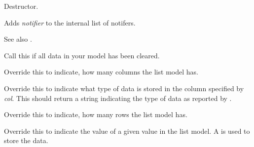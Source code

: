 \label{wxdataviewlistmodeldtor}


Destructor.

\label{wxdataviewlistmodeladdnotifier}


Adds {\it notifier} to the internal list of notifers.

See also .

\label{wxdataviewlistmodelcleared}


Call this if all data in your model has been cleared.

\label{wxdataviewlistmodelgetcolumncount}


Override this to indicate, how many columns the list
model has.

\label{wxdataviewlistmodelgetcolumntype}


Override this to indicate what type of data is stored in the
column specified by {\it col}. This should return a string
indicating the type of data as reported by .

\label{wxdataviewlistmodelgetrowcount}


Override this to indicate, how many rows the list
model has.

\label{wxdataviewlistmodelgetvalue}


Override this to indicate the value of a given value
in the list model. A 
is used to store the data.

\label{wxdataviewlistmodelremovenotifier}

